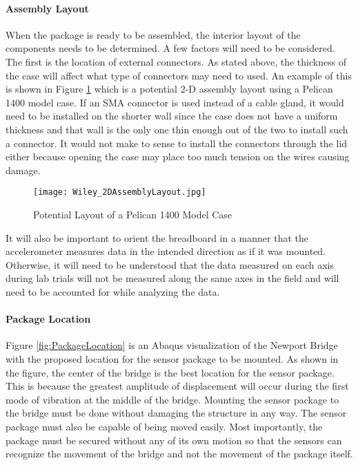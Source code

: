 \paragraph{Assembly Layout}


When the package is ready to be assembled, the interior layout of the components needs to be determined. A few factors will need to be considered. 
The first is the location of external connectors. As stated above, the thickness of the case will affect what type of connectors may need to used. 
An example of this is shown in Figure \ref{fig:Assembly} which is a potential 2-D assembly layout using a Pelican 1400 model case. If an SMA
connector is used instead of a cable gland, it would need to be installed on the shorter wall since the case does not have a uniform thickness and
that wall is the only one thin enough out of the two to install such a connector. It would not make to sense to install the connectors through
the lid either because opening the case may place too much tension on the wires causing damage. 

\begin{figure}[h]
\centering
\texttt{[image: Wiley\_2DAssemblyLayout.jpg]}
\caption{\label{fig:Assembly} Potential Layout of a Pelican 1400 Model Case}
\end{figure}

It will also be important to orient the breadboard in a manner that the accelerometer measures data in the intended direction as if it was mounted. 
Otherwise, it will need to be understood that the data measured on each axis during lab trials will not be measured along the same axes in the field and
will need to be accounted for while analyzing the data. 

\paragraph{Package Location}

\indent Figure \ref{fig:PackageLocation} is an Abaqus visualization of the Newport Bridge with the proposed location for the sensor package to be mounted.
As shown in the figure, the center of the bridge is the best location for the sensor package. This is because the greatest amplitude of displacement will
occur during the first mode of vibration at the middle of the bridge. Mounting the sensor package to the bridge must be done without damaging the
structure in any way. The sensor package must also be capable of being moved easily. Most importantly, the package must be secured without any of its
own motion so that the sensors can recognize the movement of the bridge and not the movement of the package itself. 

